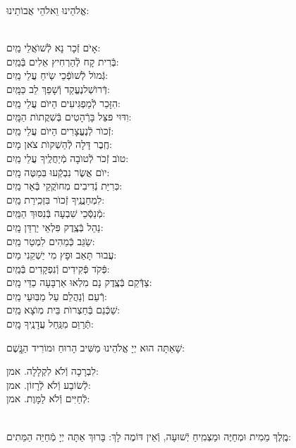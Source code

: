\documentclass[twoside, openany, parskip=half, 11pt]{book}
\begin{document}
\begin{small}אֱלֹהֵינוּ וֵאלֹהֵי אֲבוֹתֵינוּ:\end{small}\\
אָיׂם זְֿכָר נָא לְֿשׁוׂאֲלֵי \hfill מַֽיִם:\\
בְּֿרִית קָח לְֿהַרְחִיץ אֵלִים \hfill בְּֿמַֽיִם:\\
גְּֿמוׂל לְֿשׁוׂפְֿכֵי שִֹֽיחַ עֲלֵי \hfill מַֽיִם:\\
דְּֿרוׂשְׁלנֶעֱקַד וְֿשָׁפַךְ לֵב \hfill כַּמָּֽיִם:\\
הִזָּכֵר לְֿמַפְגִּיעִים הַיּוׂם עֲלֵי \hfill מַֽיִם:\\
וִדּוּי פּצֵּל בָּרְֿהָטִים בְּֿשִׁקֲתוׂת \hfill הַמָּֽיִם:\\
זְֿכוׂר לְֿנֶעֱצָרִים הַיּוׂם עֲלֵי \hfill מַֽיִם:\\
חֶֽבֶר דָּלָה לְֿהַשְׁקוׂת צׂאן \hfill מָיִם:\\
טוׂב זְֿכׂר לְֿטוׂבָה מְֿיַחֲלֶֽיךָ עֲלֵי \hfill מַֽיִם:\\
יוׂם אֲשֶׂר נִבְקְֿעוּ בּֽמַטֶּה \hfill מָֽיִם:\\
כּֽרִיַּת נְֿדִיבִים מֽחוׂקֲקֵי בְּֿאֵר \hfill מַֽיִם:\\
לִמְחַנֲנֶֽיךָ זְֿכוׂר בִּזְכִֽירַת \hfill מַֽיִם:\\
מְֿנַסְּֿכֵי שִׁבְעָה בְּֿנִסּוּךְ \hfill הַמַּֽיִם:\\
נַהֵל בְּֿצֶֽדֶק פִּלְאֵי יַרְדֵּן \hfill מָֽיִם:\\
שַֹגֵּב כְּֿמֵהִים לִמְטַר \hfill מַֽיִם:\\
עֲבוּר תָּאַב וּפָץ מִי יַשְׁקֵנִי \hfill מַיִם:\\
פְּֿקׂד פְּֿקִידִים וְֿנִפְקָדִים \hfill בְּֿמַֽיִם:\\
צַדְּֿקֵם בְּֿצֶֽדֶק נָם מִלְאוּ אַרְבָּעָה כַדֵּי \hfill מָֽיִם:\\
רְֿעֵם וְֿנַהֲלֵם עַל מַבּֽוּעֵי \hfill מַֽיִם:\\
שַׁכְּֿנֵם בְּֿחַצְרוׂת בֵּית מֽוׂצָא \hfill מַֽיִם:\\
תְּֿרַוֵּם מִנַּֽחַל עֲדָנֶֽיךָ \hfill מָֽיִם:

שָׁאַתָּה הוּא יְיָ אֱלֹהֵינוּ מַשִּׁיב הָרוּחַ וּמוֹרִיד הַגֱּֽשֶׁם:

לִבְרָכָה וְֿלֹא לִקְלָלָה. \hfill אמן:\\
לְֿשׂוֹבַע וְֿלֹא לְֿרָזוֹן. \hfill אמן:\\
לְֿחַיִּים וְֿלֹא לַמָּוֶת. \hfill אמן:

\\
מֶֽלֶךְ מֵמִית וּמְחַיֶּה וּמַצְמִֽיחַ יְֿשׁוּעָה, וְֿאֵין דּוֹמֶה לָךְ: בָּרוּךְ אַתָּה יְיָ מְֿחַיֵּה הַמֵּתִים:
\end{document}
